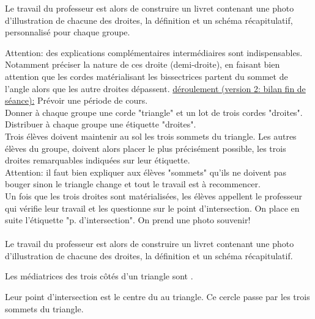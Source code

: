 {\begin{activite}
\begin{itemize}
Le travail du professeur est alors de construire un livret contenant une photo d'illustration de chacune des droites, la définition et un schéma récapitulatif, personnalisé pour chaque groupe.
\end{itemize}
Attention: des explications complémentaires intermédiaires sont indispensables. Notamment préciser la nature de ces droite (demi-droite), en faisant bien attention que les cordes matérialisant les bissectrices partent du sommet de l'angle alors que les autre droites dépassent.
\underline{déroulement (version 2: bilan fin de séance):} Prévoir une période de cours.\\
Donner à chaque groupe une corde "triangle" et un lot de trois cordes  "droites".\\
Distribuer à chaque groupe une étiquette "droites".\\
Trois élèves doivent maintenir au sol les trois sommets du triangle. Les autres élèves du groupe, doivent alors placer le plus précisément possible, les trois droites remarquables indiquées sur leur étiquette.\\
Attention: il faut bien expliquer aux élèves "sommets" qu'ils ne doivent pas bouger sinon le triangle change et tout le travail est à recommencer.\\
Un fois que les trois droites sont matérialisées, les élèves appellent le professeur qui vérifie leur travail et les questionne sur le point d'intersection. On place en suite l'étiquette "p. d'intersection". On prend une photo souvenir!\\\\
Le travail du professeur est alors de construire un livret contenant une photo d'illustration de chacune des droites, la définition et un schéma récapitulatif.


\end{activite}
}



\newpage


 \begin{aconnaitre}
Les médiatrices des trois côtés d'un triangle sont .

Leur point d'intersection est le centre du  au triangle. Ce cercle passe par les trois sommets du triangle.
\end{aconnaitre}

 \vspace{2em}
 
